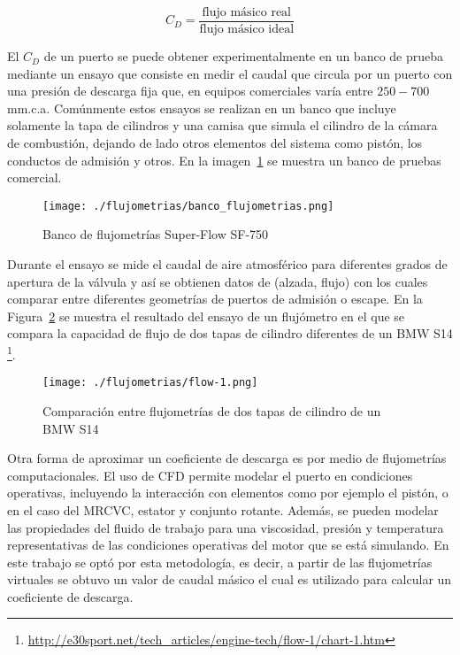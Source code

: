 \begin{equation}
  C_{D} = \frac{\text{flujo másico real}}{\text{flujo másico ideal}}
\end{equation}

El $C_{D}$ de un puerto se puede obtener experimentalmente en un banco de prueba
mediante un ensayo que consiste en medir el caudal que circula por un puerto con
una presión de descarga fija que, en equipos comerciales varía entre $250-700$
mm.c.a.
%
Comúnmente estos ensayos se realizan en un banco que incluye solamente la tapa
de cilindros y una camisa que simula el cilindro de la cámara de combustión,
dejando de lado otros elementos del sistema como pistón, los conductos de
admisión y otros.
%
En la imagen~\ref{fig:banco_flujometrias} se muestra un banco de pruebas
comercial.

\begin{figure}[h!]
  \centering
\texttt{[image: ./flujometrias/banco\_flujometrias.png]}
%
  \caption{Banco de flujometrías Super-Flow SF-750\protect\footnotemark}\label{fig:banco_flujometrias}
\end{figure}


Durante el ensayo se mide el caudal de aire atmosférico para diferentes grados
de apertura de la válvula y así se obtienen datos de (alzada, flujo) con los
cuales comparar entre diferentes geometrías de puertos de admisión o escape.
%
En la Figura~\ref{fig:flow-1} se muestra el resultado del ensayo de un
flujómetro en el que se compara la capacidad de flujo de dos tapas de cilindro
diferentes de un BMW S14
\footnote{\url{http://e30sport.net/tech_articles/engine-tech/flow-1/chart-1.htm}}.

\begin{figure}[h!]
  \centering
\texttt{[image: ./flujometrias/flow-1.png]}
  \caption{Comparación entre flujometrías de dos tapas de cilindro de un BMW S14}\label{fig:flow-1}
\end{figure}

Otra forma de aproximar un coeficiente de descarga es por medio de flujometrías
computacionales.
%
El uso de CFD permite modelar el puerto en condiciones operativas, incluyendo
la interacción con elementos como por ejemplo el pistón, o en el caso del
MRCVC, estator y conjunto rotante.
%
Además, se pueden modelar las propiedades del fluido de trabajo para una
viscosidad, presión y temperatura representativas de las condiciones operativas
del motor que se está simulando.
%
En este trabajo se optó por esta metodología, es decir, a partir de las
flujometrías virtuales se obtuvo un valor de caudal másico el cual es utilizado
para calcular un coeficiente de descarga.

